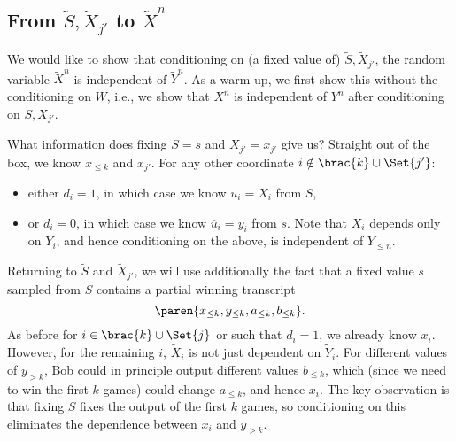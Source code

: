 \documentclass[12pt]{article}
\DeclarePairedDelimiter\paren()
\newcommand{\St}{\widetilde{S}}
\newcommand{\Xt}{\widetilde{X}}
\newcommand{\Yt}{\widetilde{Y}}
\newcommand{\uo}{\overline{u}}
\begin{document}
\subsection{From $\St, \Xt_{j'}$ to $\Xt^n$}

We would like to show that conditioning on (a fixed value of) $\St, \Xt_{j'}$,
the random variable $\Xt^n$ is independent of $\Yt^n$.
As a warm-up, we first show this without the conditioning on $W$, i.e., we
show that $X^n$ is independent of $Y^n$ after conditioning on $S, X_{j'}$.

What information does fixing $S = s$ and $X_{j'} = x_{j'}$ give us?
Straight out of the box, we know $x_{\leq k}$ and $x_{j'}$.
For any other coordinate $i \notin \brac{k} \cup \Set{j'}$:
\begin{itemize}
  \item either $d_i = 1$, in which case we know $\overline{u}_i = X_i$ from
    $S$,
  \item or $d_i = 0$, in which case we know $\uo_i = y_i$ from $s$.
    Note that $X_i$ depends only on $Y_i$, and hence conditioning on the above,
    is independent of $Y_{\leq n}$.
\end{itemize}

Returning to $\St$ and $\Xt_{j'}$, we will use additionally the fact that
a fixed value $s$ sampled from $\St$ contains a partial winning transcript
\[
  \paren{x_{\leq k}, y_{\leq k}, a_{\leq k}, b_{\leq k}}.
\]
As before for $i \in \brac{k} \cup \Set{j}$ or such that $d_i = 1$, we already
know $x_{i}$.
However, for the remaining $i$, $\Xt_i$ is not just dependent on $\Yt_i$.
For different values of $y_{> k}$, Bob could in principle output different
values $b_{\leq k}$, which (since we need to win the first $k$ games) could
change $a_{\leq k}$, and hence $x_i$.
The key observation is that fixing $S$ fixes the output of the first $k$ games,
so conditioning on this eliminates the dependence between $x_i$ and $y_{> k}$.
\end{document}
